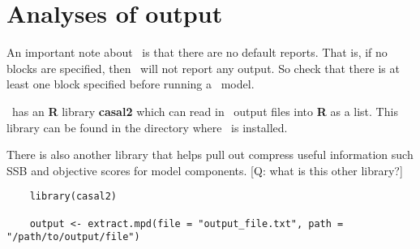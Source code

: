 \section{Analyses of output}\label{Sec:output}

An important note about \CNAME\ is that there are no default reports. That is, if no  blocks are specified, then \CNAME\ will not report any output. So check that there is at least one  block specified before running a \CNAME\ model.

\CNAME\ has an \textbf{R} library \textbf{casal2} which can read in \CNAME\ output files into \textbf{R} as a list. This library can be found in the directory where \CNAME\ is installed.

There is also another library that helps pull out compress useful information such SSB and objective scores for model components. [Q:  what is this other library?]

{\small{\begin{verbatim}
	library(casal2)
	
	output <- extract.mpd(file = "output_file.txt", path = "/path/to/output/file")
\end{verbatim}}}
